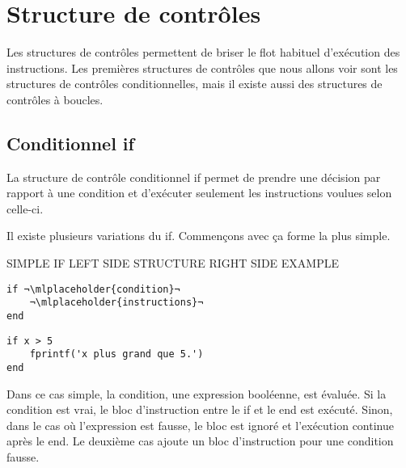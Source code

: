 \documentclass{tufte-handout}
\begin{document}
\section{Structure de contrôles}
Les structures de contrôles permettent de briser le flot habituel d'exécution des instructions. Les premières structures de contrôles que nous allons voir sont les structures de contrôles conditionnelles, mais il existe aussi des structures de contrôles à boucles.
\subsection{Conditionnel if}
La structure de contrôle conditionnel if permet de prendre une décision par rapport à une condition et d'exécuter seulement les instructions voulues selon celle-ci.

Il existe plusieurs variations du if. Commençons avec ça forme la plus simple.

SIMPLE IF LEFT SIDE STRUCTURE RIGHT SIDE EXAMPLE
\begin{fullwidth}
    \begin{minipage}{.45\linewidth}
    \begin{lstlisting}[title={Structure du if simple}]
if ¬\mlplaceholder{condition}¬
    ¬\mlplaceholder{instructions}¬
end
    \end{lstlisting}
    \end{minipage}\hfill
    \begin{minipage}{.45\linewidth}
    \begin{lstlisting}[title={Exemple du if simple}]
if x > 5
    fprintf('x plus grand que 5.')
end
    \end{lstlisting}
    \end{minipage}
\end{fullwidth}

Dans ce cas simple, la condition, une expression booléenne, est évaluée. Si la condition est vrai, le bloc d'instruction entre le if et le end est exécuté. Sinon, dans le cas où l'expression est fausse, le bloc est ignoré et l'exécution continue après le end.
Le deuxième cas ajoute un bloc d'instruction pour une condition fausse.
\end{document}
